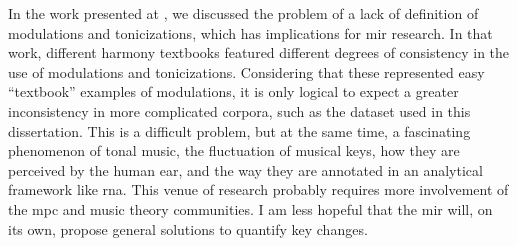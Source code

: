 
In the work presented at \textcite{napoleslopez2020local},
we discussed the problem of a lack of definition of
modulations and tonicizations, which has implications for
\gls{mir} research. In that work, different harmony
textbooks featured different degrees of consistency in the
use of modulations and tonicizations. Considering that these
represented  easy ``textbook'' examples of modulations, it
is only logical to expect a greater inconsistency in more
complicated corpora, such as the dataset used in this
dissertation. This is a difficult problem, but at the same
time, a fascinating phenomenon of tonal music, the
fluctuation of musical keys, how they are perceived by the
human ear, and the way they are annotated in an analytical
framework like \gls{rna}. This venue of research probably
requires more involvement of the \gls{mpc} and music theory
communities. I am less hopeful that the \gls{mir} will, on
its own, propose general solutions to quantify key changes.
